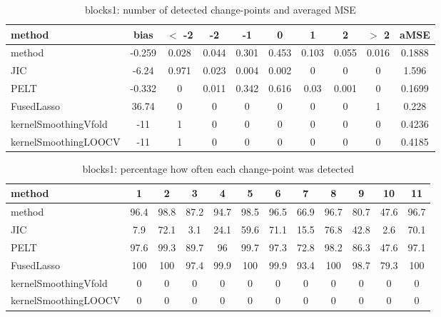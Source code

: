\begin{table}[ht]
\centering
\begin{tabular}{l|c|ccccccc|c}
  \hline
method & bias & $<$ -2 & -2 & -1 & 0 & 1 & 2 & $>$ 2 & aMSE \\ 
  \hline
method & -0.259 & 0.028 & 0.044 & 0.301 & 0.453 & 0.103 & 0.055 & 0.016 & 0.1888 \\ 
  JIC & -6.24 & 0.971 & 0.023 & 0.004 & 0.002 &     0 &     0 &     0 & 1.596 \\ 
  PELT & -0.332 &     0 & 0.011 & 0.342 & 0.616 &  0.03 & 0.001 &     0 & 0.1699 \\ 
  FusedLasso & 36.74 &     0 &     0 &     0 &     0 &     0 &     0 &     1 & 0.228 \\ 
  kernelSmoothingVfold &   -11 &     1 &     0 &     0 &     0 &     0 &     0 &     0 & 0.4236 \\ 
  kernelSmoothingLOOCV &   -11 &     1 &     0 &     0 &     0 &     0 &     0 &     0 & 0.4185 \\ 
   \hline
\end{tabular}
\caption{blocks1: number of detected change-points and averaged MSE} 
\label{tab:blocks1Njumps}
\end{table}
\begin{table}[ht]
\centering
\begin{tabular}{l|ccccccccccc}
  \hline
method & 1 & 2 & 3 & 4 & 5 & 6 & 7 & 8 & 9 & 10 & 11 \\ 
  \hline
method &   96.4 &   98.8 &   87.2 &   94.7 &   98.5 &   96.5 &   66.9 &   96.7 &   80.7 &   47.6 &   96.7 \\ 
  JIC &    7.9 &   72.1 &    3.1 &   24.1 &   59.6 &   71.1 &   15.5 &   76.8 &   42.8 &    2.6 &   70.1 \\ 
  PELT &   97.6 &   99.3 &   89.7 &     96 &   99.7 &   97.3 &   72.8 &   98.2 &   86.3 &   47.6 &   97.1 \\ 
  FusedLasso &    100 &    100 &   97.4 &   99.9 &    100 &   99.9 &   93.4 &    100 &   98.7 &   79.3 &    100 \\ 
  kernelSmoothingVfold &      0 &      0 &      0 &      0 &      0 &      0 &      0 &      0 &      0 &      0 &      0 \\ 
  kernelSmoothingLOOCV &      0 &      0 &      0 &      0 &      0 &      0 &      0 &      0 &      0 &      0 &      0 \\ 
   \hline
\end{tabular}
\caption{blocks1: percentage how often each change-point was detected} 
\label{tab:blocks1Detections}
\end{table}
